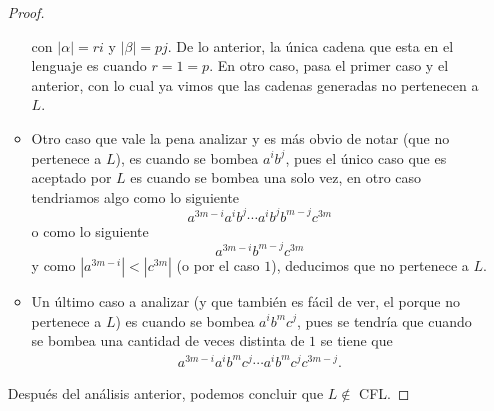 \documentclass{article}
\begin{document}
\begin{enumerate}
\begin{proof}
\begin{itemize}
        con $|\alpha| = ri$ y $|\beta| = pj$. De lo anterior, la única cadena que esta en el lenguaje es cuando
        $r = 1 = p$. En otro caso, pasa el primer caso y el anterior, con lo cual ya vimos que las cadenas generadas
        no pertenecen a $L$.
      \item Otro caso que vale la pena analizar y es más obvio de notar (que no pertenece a $L$), es cuando se bombea
        $a^i b^j$, pues el único caso que es aceptado por $L$ es cuando se bombea una solo vez, en otro caso tendriamos
        algo como lo siguiente
        \[
        a^{3m - i} a^i b^j \dotsm a^i b^j b^{m - j} c^{3m} 
        \]
        o como lo siguiente
       \[
        a^{3m - i} b^{m - j} c^{3m} 
        \]
        y como $|a^{3m - i}| < |c^{3m}|$ (o por el caso $1$), deducimos que no pertenece a $L$.
      \item Un último caso a analizar (y que también es fácil de ver, el porque no pertenece a $L$)
        es cuando se bombea $a^i b^m c^j$, pues se tendría que cuando se bombea una cantidad de
        veces distinta de $1$ se tiene que
        \begin{eqnarray*}
          a^{3m - i} a^i b^m c^j \dotsm  a^i b^m c^j  c^{3m - j}.
        \end{eqnarray*}
      \end{itemize}
      Después del análisis anterior, podemos concluir que $L \notin$ CFL.
    \end{proof}
\end{enumerate}
\end{document}
